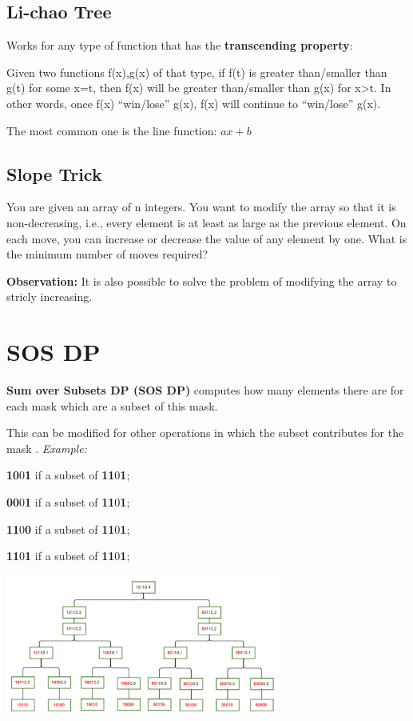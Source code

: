 
    \subsection{Li-chao Tree}

        Works for any type of function that has the \textbf{transcending property}:

        Given two functions f(x),g(x) of that type, 
        if f(t) is greater than/smaller than g(t) for some x=t,
        then f(x) will be greater than/smaller than g(x) for x>t.
        In other words, once f(x) “win/lose” g(x), f(x) will continue to “win/lose” g(x).

        The most common one is the line function: $ ax + b $

    \subsection{Slope Trick}
    
    You are given an array of n integers. You want to modify the array so that it is non-decreasing, i.e., every element is at least as large as the previous element.
    On each move, you can increase or decrease the value of any element by one. What is the minimum number of moves required?
    
    \textbf{Observation: } It is also possible to solve the problem of modifying the array to stricly increasing.


\section{SOS DP}

    \textbf{Sum over Subsets DP (SOS DP)} computes how many elements there are for each mask
    which are a subset of this mask.

    This can be modified for other operations in which the subset contributes for the mask
    .
    \textit{Example:}

    \textbf{10}0\textbf{1} if a subset of \textbf{11}0\textbf{1};

    \textbf{00}0\textbf{1} if a subset of \textbf{11}0\textbf{1};
    
    \textbf{11}0\textbf{0} if a subset of \textbf{11}0\textbf{1};
    
    \textbf{11}0\textbf{1} if a subset of \textbf{11}0\textbf{1};

    \begin{center}
        \includegraphics[width=9cm]{content/dynamic-programming/sos-example.pdf}
    \end{center}

